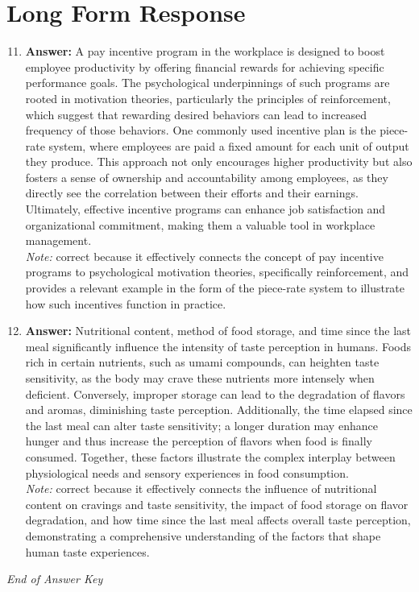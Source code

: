 \documentclass[12pt]{article}
\begin{document}
\section*{Long Form Response}
\begin{enumerate}[label=\arabic*.]
\setcounter{enumi}{10}
\item \textbf{Answer:} A pay incentive program in the workplace is designed to boost employee productivity by offering financial rewards for achieving specific performance goals. The psychological underpinnings of such programs are rooted in motivation theories, particularly the principles of reinforcement, which suggest that rewarding desired behaviors can lead to increased frequency of those behaviors. One commonly used incentive plan is the piece-rate system, where employees are paid a fixed amount for each unit of output they produce. This approach not only encourages higher productivity but also fosters a sense of ownership and accountability among employees, as they directly see the correlation between their efforts and their earnings. Ultimately, effective incentive programs can enhance job satisfaction and organizational commitment, making them a valuable tool in workplace management.
\\ \textit{Note:} correct because it effectively connects the concept of pay incentive programs to psychological motivation theories, specifically reinforcement, and provides a relevant example in the form of the piece-rate system to illustrate how such incentives function in practice.
\item \textbf{Answer:} Nutritional content, method of food storage, and time since the last meal significantly influence the intensity of taste perception in humans. Foods rich in certain nutrients, such as umami compounds, can heighten taste sensitivity, as the body may crave these nutrients more intensely when deficient. Conversely, improper storage can lead to the degradation of flavors and aromas, diminishing taste perception. Additionally, the time elapsed since the last meal can alter taste sensitivity; a longer duration may enhance hunger and thus increase the perception of flavors when food is finally consumed. Together, these factors illustrate the complex interplay between physiological needs and sensory experiences in food consumption.
\\ \textit{Note:} correct because it effectively connects the influence of nutritional content on cravings and taste sensitivity, the impact of food storage on flavor degradation, and how time since the last meal affects overall taste perception, demonstrating a comprehensive understanding of the factors that shape human taste experiences.
\end{enumerate}

\vfill
\noindent\textit{End of Answer Key}
\end{document}
